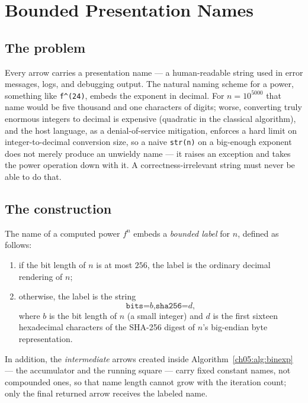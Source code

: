 \section{Bounded Presentation Names}
\label{ch05:sec:names}

\subsection{The problem}

Every arrow carries a presentation name --- a human-readable string used in
error messages, logs, and debugging output. The natural naming scheme for a
power, something like \texttt{f\^{}(24)}, embeds the exponent in decimal.
For $n = 10^{5000}$ that name would be five thousand and one characters of
digits; worse, converting truly enormous integers to decimal is expensive
(quadratic in the classical algorithm), and the host language, as a
denial-of-service mitigation, enforces a hard limit on integer-to-decimal
conversion size, so a naive \texttt{str(n)} on a big-enough exponent does
not merely produce an unwieldy name --- it raises an exception and takes
the power operation down with it. A correctness-irrelevant string must
never be able to do that.

\subsection{The construction}

\begin{construction}
\label{ch05:con:names}
The name of a computed power $f^{n}$ embeds a \emph{bounded label} for $n$,
defined as follows:
\begin{enumerate}
\item if the bit length of $n$ is at most $256$, the label is the ordinary
decimal rendering of $n$;
\item otherwise, the label is the string
\[
  \texttt{bits=}b\texttt{,sha256=}d,
\]
where $b$ is the bit length of $n$ (a small integer) and $d$ is the first
sixteen hexadecimal characters of the SHA-256 digest of $n$'s big-endian
byte representation.
\end{enumerate}
In addition, the \emph{intermediate} arrows created inside
Algorithm~\ref{ch05:alg:binexp} --- the accumulator and the running square
--- carry fixed constant names, not compounded ones, so that name length
cannot grow with the iteration count; only the final returned arrow
receives the labeled name.
\end{construction}

